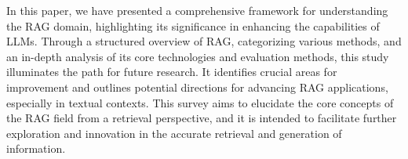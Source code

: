 In this paper, we have presented a comprehensive framework for understanding the RAG domain, highlighting its significance in enhancing the capabilities of  LLMs. Through a structured overview of RAG, categorizing various methods, and an in-depth analysis of its core technologies and evaluation methods, this study illuminates the path for future research. It identifies crucial areas for improvement and outlines potential directions for advancing RAG applications, especially in textual contexts. This survey aims to elucidate the core concepts of the RAG field from a retrieval perspective, and it is intended to facilitate further exploration and innovation in the accurate retrieval and generation of information.